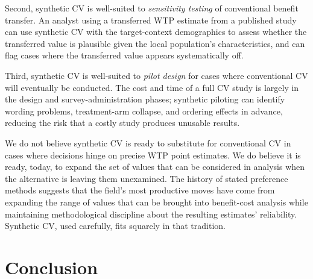\documentclass[12pt]{article}
\begin{document}
Second, synthetic CV is well-suited to \emph{sensitivity testing} of conventional benefit transfer. An analyst using a transferred WTP estimate from a published study can use synthetic CV with the target-context demographics to assess whether the transferred value is plausible given the local population's characteristics, and can flag cases where the transferred value appears systematically off.

Third, synthetic CV is well-suited to \emph{pilot design} for cases where conventional CV will eventually be conducted. The cost and time of a full CV study is largely in the design and survey-administration phases; synthetic piloting can identify wording problems, treatment-arm collapse, and ordering effects in advance, reducing the risk that a costly study produces unusable results.

We do not believe synthetic CV is ready to substitute for conventional CV in cases where decisions hinge on precise WTP point estimates. We do believe it is ready, today, to expand the set of values that can be considered in analysis when the alternative is leaving them unexamined. The history of stated preference methods suggests that the field's most productive moves have come from expanding the range of values that can be brought into benefit-cost analysis while maintaining methodological discipline about the resulting estimates' reliability. Synthetic CV, used carefully, fits squarely in that tradition.

\section{Conclusion}

\newpage
\printbibliography
\end{document}

